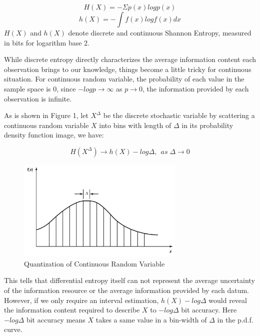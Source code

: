 \documentclass[review]{elsarticle}
\begin{document}
\begin{equation}
\label{dentropy}
H(X)=-\Sigma p(x)logp(x)
\end{equation}
\begin{equation}
\label{centropy}
h(X)=-\int f(x)logf(x)dx
\end{equation}   
$H(X)$ and $h(X)$ denote discrete and continuous Shannon Entropy, measured in bits for logarithm base 2. %

While discrete entropy directly characterizes the average information content each observation brings to our knowledge, things become a little tricky for continuous situation. For continuous random variable, the probability of each value in the sample space is 0, since $-logp \to \infty$  as $p \to 0$, the information provided by each observation is infinite.  

As is shown in Figure 1, let $X^\Delta$ be the discrete stochastic variable by scattering a continuous random variable $X$ into bins with length of $\Delta$ in its probability density function image, we have:

\begin{equation}\label{correct}
H(X^\Delta)\to h(X)-log\Delta,~~as\; \Delta \to 0
\end{equation}
\begin{figure}[H]
\centering
\includegraphics[width=8cm]{Quantization.png}
\caption{Quantization of Continuous Random Variable}%
\end{figure}
This tells that differential entropy itself can not represent the average uncertainty of the information resource or the average information provided by each datum. However, if we only require an interval estimation, $h(X)-log\Delta $ would reveal the information content required to describe $X$ to $ -log\Delta$ bit accuracy\citep{cover2012elements}.  Here $ -log\Delta$ bit accuracy means $X$ takes a same value in a bin-width of $\Delta$ in the p.d.f. curve. 
\end{document}

